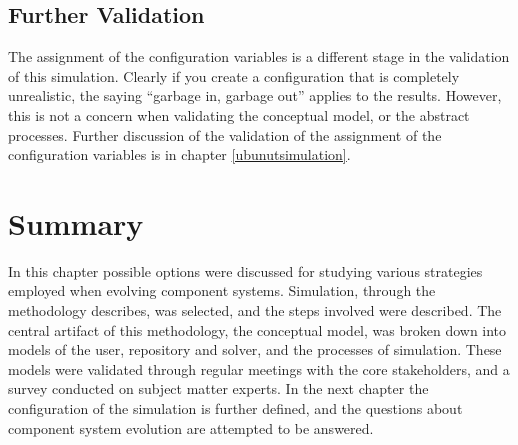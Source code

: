 \subsection{Further Validation}
The assignment of the configuration variables is a different stage in the validation of this simulation.
Clearly if you create a configuration that is completely unrealistic, the saying ``garbage in, garbage out'' applies to the results.
However, this is not a concern when validating the conceptual model, or the abstract processes.
Further discussion of the validation of the assignment of the configuration variables is in chapter \ref{ubunutsimulation}.

\section{Summary}
{}In this chapter possible options were discussed for studying various strategies employed when evolving component systems.
{}Simulation, through the methodology \citep{Law2005} describes, was selected, and the steps involved were described.
{}The central artifact of this methodology, the conceptual model, was broken down into models of the user, repository and solver, and the processes of simulation.
{}These models were validated through regular meetings with the core stakeholders, and a survey conducted on subject matter experts.
{}In the next chapter the configuration of the simulation is further defined, and the questions about component system evolution are attempted to be answered.
